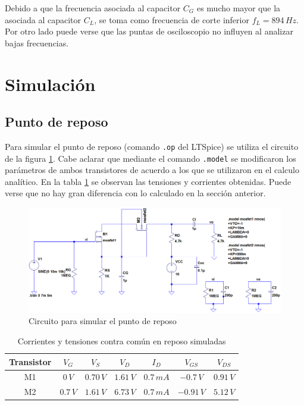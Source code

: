 \documentclass[10pt,spanish,a4paper,notitlepage]{article}
\begin{document}
Debido a que la frecuencia asociada al capacitor $C_G$ es mucho mayor que la asociada al capacitor $C_L$, se toma como frecuencia de corte inferior $f_L= 894\,\unit{Hz}$. Por otro lado puede verse que las puntas de osciloscopio no influyen al analizar bajas frecuencias.



\section{Simulación}

\subsection{Punto de reposo}
Para simular el punto de reposo (comando \texttt{.op} del LTSpice) se utiliza el circuito
de la figura \ref{fig:SIMUreposo}. Cabe aclarar que mediante el comando \texttt{.model} se
modificaron los parámetros de ambos transistores de acuerdo a los que se utilizaron en
el calculo analítico. En la tabla \ref{table:valoresreposoSIMU} se observan las
tensiones y corrientes obtenidas. Puede verse que no hay gran diferencia con lo
calculado en la sección anterior.


\begin{figure}[H]
\centering
\includegraphics[scale=0.5]{circuitos/circuitosimuOP.png}
\caption{Circuito para simular el punto de reposo}
\label{fig:SIMUreposo}
\end{figure}

\begin{table}[H]
\centering
\begin{tabular}{|c|c|c|c|c|c|c|} 
\hline
Transistor & $V_{G}$ & $V_{S}$ & $V_{D}$ & $I_{D}$ & $V_{GS}$ & $V_{DS}$  \\ \hline
M1 & $0\,\unit{V}$ & $0.70\,\unit{V}$  & $1.61\,\unit{V}$ & $0.7\,\unit{mA}$ & $-0.7\,\unit{V}$  & $0.91\,\unit{V}$ \\ \hline
M2 & $0.7\,\unit{V}$ & $1.61\,\unit{V}$ & $6.73\,\unit{V}$ & $0.7\,\unit{mA}$ & $-0.91\,\unit{V}$ & $5.12\,\unit{V}$\\ \hline
\end{tabular}
\caption{Corrientes y tensiones contra común en reposo simuladas}
\label{table:valoresreposoSIMU}
\end{table}
\end{document}
